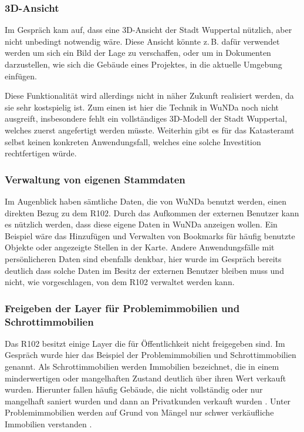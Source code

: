\subsubsection{3D-Ansicht}
Im Gespräch kam auf, dass eine 3D-Ansicht der Stadt Wuppertal nützlich, aber nicht unbedingt notwendig wäre.
Diese Ansicht könnte z.\,B. dafür verwendet werden um sich ein Bild der Lage zu verschaffen, oder um in Dokumenten darzustellen, wie sich die Gebäude eines Projektes, in die aktuelle Umgebung einfügen.

Diese Funktionalität wird allerdings nicht in näher Zukunft realisiert werden, da sie sehr kostspielig ist.
Zum einen ist hier die Technik in \ac{WuNDa} noch nicht ausgreift, insbesondere fehlt ein vollständiges 3D-Modell der Stadt Wuppertal, welches zuerst angefertigt werden müsste.
Weiterhin gibt es für das Katasteramt selbst keinen konkreten Anwendungsfall, welches eine solche Investition rechtfertigen würde.  

\subsubsection{Verwaltung von eigenen Stammdaten}
Im Augenblick haben sämtliche Daten, die von \ac{WuNDa} benutzt werden, einen direkten Bezug zu dem R102.
Durch das Aufkommen der externen Benutzer kann es nützlich werden, dass diese eigene Daten in \ac{WuNDa} anzeigen wollen.
Ein Beispiel wäre das Hinzufügen und Verwalten von Bookmarks für häufig benutzte Objekte oder angezeigte Stellen in der Karte.
Andere Anwendungsfälle mit persönlicheren Daten sind ebenfalls denkbar, hier wurde im Gespräch bereits deutlich dass solche Daten im Besitz der externen Benutzer bleiben muss und nicht, wie vorgeschlagen, von dem R102 verwaltet werden kann.
\subsubsection{Freigeben der Layer für Problemimmobilien und Schrottimmobilien}
Das R102 besitzt einige Layer die für Öffentlichkeit nicht freigegeben sind.
Im Gespräch wurde hier das Beispiel der Problemimmobilien und Schrottimmobilien genannt.
Als Schrottimmobilien werden Immobilien bezeichnet, die in einem minderwertigen oder mangelhaften Zustand deutlich über ihren Wert verkauft wurden.
Hierunter fallen häufig Gebäude, die nicht vollständig oder nur mangelhaft saniert wurden und dann an Privatkunden verkauft wurden \autocite[vgl.][]{iva-schrottimmo}.
Unter Problemimmobilien werden auf Grund von Mängel nur schwer verkäufliche Immobilien verstanden \autocite[vgl.][]{immo-problemimmo}.

